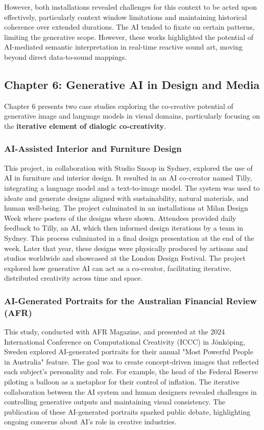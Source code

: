 However, both installations revealed challenges for this context to be acted upon effectively, particularly context window limitations and maintaining historical coherence over extended durations. The AI tended to fixate on certain patterns, limiting the generative scope. However, these works highlighted the potential of AI-mediated semantic interpretation in real-time reactive sound art, moving beyond direct data-to-sound mappings.

\subsection{Chapter 6: Generative AI in Design and Media}

Chapter 6 presents two case studies exploring the co-creative potential of generative image and language models in visual domains, particularly focusing on the \textbf{iterative element of dialogic co-creativity}. 

\subsubsection{AI-Assisted Interior and Furniture Design}

This project, in collaboration with Studio Snoop in Sydney, explored the use of AI in furniture and interior design. It resulted in an AI co-creator named Tilly, integrating a language model and a text-to-image model. The system was used to ideate and generate designs aligned with sustainability, natural materials, and human well-being. The project culminated in an installations at Milan Design Week where posters of the designs where shown. Attendees provided daily feedback to Tilly, an AI, which then informed design iterations by a team in Sydney.  This process culminated in a final design presentation at the end of the week.  Later that year, these designs were physically produced by artisans and studios worldwide and showcased at the London Design Festival. The project explored how generative AI can act as a co-creator, facilitating iterative, distributed creativity across time and space.

\subsubsection{AI-Generated Portraits for the Australian Financial Review (AFR)}

This study, conducted with AFR Magazine, and presented at the 2024 International Conference on Computational Creativity (ICCC) in Jönköping, Sweden explored AI-generated portraits for their annual "Most Powerful People in Australia" feature. The goal was to create concept-driven images that reflected each subject’s personality and role. For example, the head of the Federal Reserve piloting a balloon as a metaphor for their control of inflation. The iterative collaboration between the AI system and human designers revealed challenges in controlling generative outputs and maintaining visual consistency. The publication of these AI-generated portraits sparked public debate, highlighting ongoing concerns about AI's role in creative industries.


